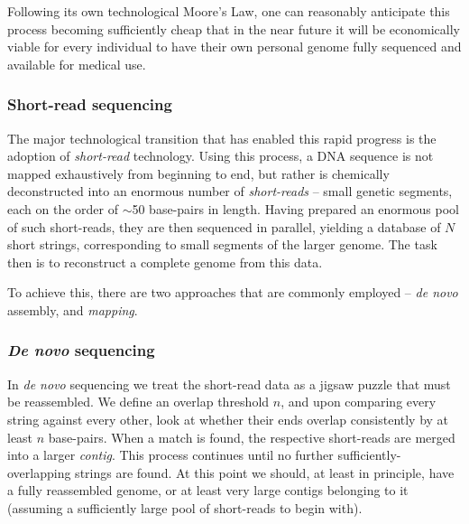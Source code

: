 Following its own technological Moore's Law, one can reasonably anticipate this process becoming sufficiently cheap that in the near future it will be economically viable for every individual to have their own personal genome fully sequenced and available for medical use.

%
%

\subsubsection{Short-read sequencing}

The major technological transition that has enabled this rapid progress is the adoption of \textit{short-read} technology. Using this process, a DNA sequence is not mapped exhaustively from beginning to end, but rather is chemically deconstructed into an enormous number of \textit{short-reads} -- small genetic segments, each on the order of $\sim$50 base-pairs in length. Having prepared an enormous pool of such short-reads, they are then sequenced in parallel, yielding a database of $N$ short strings, corresponding to small segments of the larger genome. The task then is to reconstruct a complete genome from this data.

To achieve this, there are two approaches that are commonly employed -- \textit{de novo} assembly, and \textit{mapping}.

%
%

\subsubsection{\textit{De novo} sequencing}

In \textit{de novo} sequencing we treat the short-read data as a jigsaw puzzle that must be reassembled. We define an overlap threshold $n$, and upon comparing every string against every other, look at whether their ends overlap consistently by at least $n$ base-pairs. When a match is found, the respective short-reads are merged into a larger \textit{contig}. This process continues until no further sufficiently-overlapping strings are found. At this point we should, at least in principle, have a fully reassembled genome, or at least very large contigs belonging to it (assuming a sufficiently large pool of short-reads to begin with).

